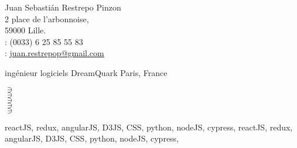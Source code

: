 \documentclass[10pt]{article}
\begin{document}
\newcommand{\myProExperienceDetailSkills}[1]{
    \noindent \begin{minipage}{0.13\linewidth}{ \hspace{\fill} }
    \end{minipage}
    \begin{minipage}{0.75\linewidth}{
        #1
    }
    \end{minipage}
    \medskip
}
\newcommand{\myProExperienceDetailTools}[2]{
    \noindent \begin{minipage}[t]{0.13\linewidth}{ \hspace{\fill} }
    \end{minipage}
    \begin{minipage}[t]{0.25\linewidth}{
        \textbf{\color{myBlue}{#1: }}
    }
    \end{minipage}
    \begin{minipage}[t]{0.45\linewidth}{
        #2
    }
    \end{minipage}
    
}

\pagestyle{empty}

\noindent Juan Sebasti\'an Restrepo Pinzon\\
2 place de l'arbonnoise,\\
59000 Lille.\\
\Mobilefone : (0033) 6 25 85 55 83\\
\Email: \url{juan.restrepop@gmail.com}\\


    {ingénieur logiciels}
    {DreamQuark}
    {Paris, France}

\myProExperienceDetailSummary{\loremParagraph}

\myProExperienceDetailSkills{
    $\ni$ \loremSentence{}\\
    $\ni$ \loremSentence{}\\
    $\ni$ \loremSentence{}\\
    $\ni$ \loremSentence{}\\
    $\ni$ \loremSentence{}\\
}

\myProExperienceDetailTools{environnment technique}{
    reactJS, redux, angularJS, D3JS, CSS, python, nodeJS, cypress, reactJS, redux, angularJS, D3JS, CSS, python, nodeJS, cypress,
}






\end{document}
